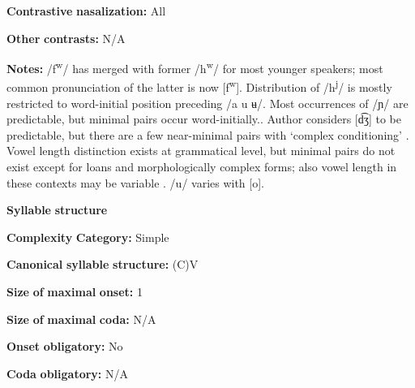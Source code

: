 \begin{styleBody}
\textbf{Contrastive} \textbf{nasalization:} All
\end{styleBody}

\begin{styleBody}
\textbf{Other} \textbf{contrasts:} N/A
\end{styleBody}

\begin{styleBody}
\textbf{Notes:} /f\textsuperscript{w}/ has merged with former /h\textsuperscript{w}/ for most younger speakers; most common pronunciation of the latter is now [f\textsuperscript{w}]. Distribution of /h\textsuperscript{j}/ is mostly restricted to word-initial position preceding /a u ʉ/. Most occurrences of /ɲ/ are predictable, but minimal pairs occur word-initially.. Author considers [d͡ʒ] to be predictable, but there are a few near-minimal pairs with ‘complex conditioning’ \citep[30-49]{Olawsky2006}. Vowel length distinction exists at grammatical level, but minimal pairs do not exist except for loans and morphologically complex forms; also vowel length in these contexts may be variable \citep[56-7]{Olawsky2006}. /u/ varies with [o].
\end{styleBody}

\begin{styleBody}
\textbf{Syllable} \textbf{structure}
\end{styleBody}

\begin{styleBody}
\textbf{Complexity} \textbf{Category:} Simple
\end{styleBody}

\begin{styleBody}
\textbf{Canonical} \textbf{syllable} \textbf{structure:} (C)V \citep[75-6]{Olawsky2006}
\end{styleBody}

\begin{styleBody}
\textbf{Size} \textbf{of} \textbf{maximal} \textbf{onset:} 1
\end{styleBody}

\begin{styleBody}
\textbf{Size} \textbf{of} \textbf{maximal} \textbf{coda:} N/A
\end{styleBody}

\begin{styleBody}
\textbf{Onset} \textbf{obligatory:} No
\end{styleBody}

\begin{styleBody}
\textbf{Coda} \textbf{obligatory:} N/A
\end{styleBody}

